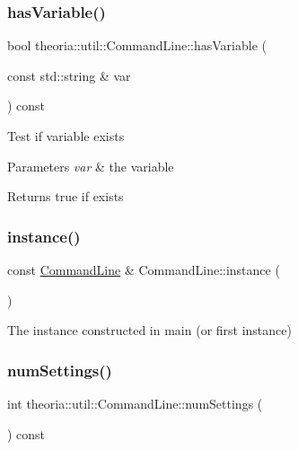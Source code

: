 \subsubsection{\texorpdfstring{has\+Variable()}{hasVariable()}}
{\footnotesize\ttfamily bool theoria\+::util\+::\+Command\+Line\+::has\+Variable (\begin{DoxyParamCaption}\item[{const std\+::string \&}]{var }\end{DoxyParamCaption}) const\hspace{0.3cm}{\ttfamily [inline]}}

Test if variable exists 
\begin{DoxyParams}{Parameters}
{\em var} & the variable \\
\hline
\end{DoxyParams}
\begin{DoxyReturn}{Returns}
true if exists 
\end{DoxyReturn}
\mbox{\label{classtheoria_1_1util_1_1CommandLine_a361f672089b8bd3cb794645ee4629b72}} 
\subsubsection{\texorpdfstring{instance()}{instance()}}
{\footnotesize\ttfamily const \hyperlink{classtheoria_1_1util_1_1CommandLine}{Command\+Line} \& Command\+Line\+::instance (\begin{DoxyParamCaption}{ }\end{DoxyParamCaption})\hspace{0.3cm}{\ttfamily [static]}}

The instance constructed in main (or first instance) \mbox{\label{classtheoria_1_1util_1_1CommandLine_aa0f4075a16a8c490e5e27596534ca485}} 
\subsubsection{\texorpdfstring{num\+Settings()}{numSettings()}}
{\footnotesize\ttfamily int theoria\+::util\+::\+Command\+Line\+::num\+Settings (\begin{DoxyParamCaption}{ }\end{DoxyParamCaption}) const\hspace{0.3cm}{\ttfamily [inline]}}


